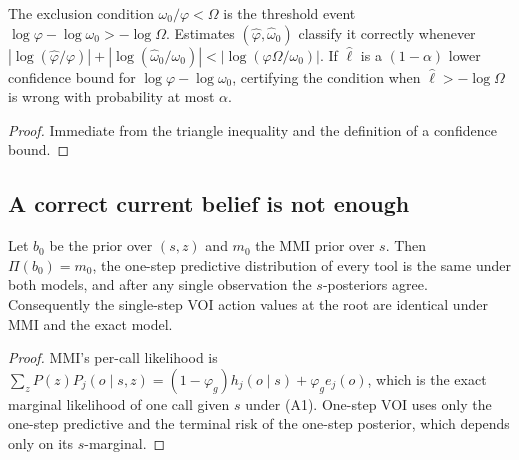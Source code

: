 \begin{proposition}\label{prop:phihat}
The exclusion condition $\omega_0/\varphi<\Omega$ is the threshold event $\log\varphi-\log\omega_0>-\log\Omega$.
Estimates $(\hat\varphi,\hat\omega_0)$ classify it correctly whenever
$|\log(\hat\varphi/\varphi)|+|\log(\hat\omega_0/\omega_0)|<|\log(\varphi\Omega/\omega_0)|$. If $\hat\ell$ is a
$(1-\alpha)$ lower confidence bound for $\log\varphi-\log\omega_0$, certifying the condition when $\hat\ell>-\log\Omega$
is wrong with probability at most $\alpha$.
\end{proposition}
\begin{proof}
Immediate from the triangle inequality and the definition of a confidence bound.
\end{proof}

\subsection{A correct current belief is not enough}

\begin{lemma}\label{lem:mmi-root}
Let $b_0$ be the prior over $(s,z)$ and $m_0$ the MMI prior over $s$. Then $\Pi(b_0)=m_0$, the one-step predictive
distribution of every tool is the same under both models, and after any single observation the $s$-posteriors agree.
Consequently the single-step VOI action values at the root are identical under MMI and the exact model.
\end{lemma}
\begin{proof}
MMI's per-call likelihood is $\sum_z P(z)P_j(o\mid s,z)=(1-\varphi_g)h_j(o\mid s)+\varphi_ge_j(o)$, which is the
exact marginal likelihood of one call given $s$ under (A1). One-step VOI uses only the one-step predictive and the
terminal risk of the one-step posterior, which depends only on its $s$-marginal.
\end{proof}

